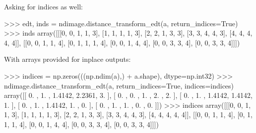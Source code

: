 \begin{DoxyVerb}
Asking for indices as well:

>>> edt, inds = ndimage.distance_transform_edt(a, return_indices=True)
>>> inds
array([[[0, 0, 1, 1, 3],
        [1, 1, 1, 1, 3],
        [2, 2, 1, 3, 3],
        [3, 3, 4, 4, 3],
        [4, 4, 4, 4, 4]],
       [[0, 0, 1, 1, 4],
        [0, 1, 1, 1, 4],
        [0, 0, 1, 4, 4],
        [0, 0, 3, 3, 4],
        [0, 0, 3, 3, 4]]])

With arrays provided for inplace outputs:

>>> indices = np.zeros(((np.ndim(a),) + a.shape), dtype=np.int32)
>>> ndimage.distance_transform_edt(a, return_indices=True, indices=indices)
array([[ 0.    ,  1.    ,  1.4142,  2.2361,  3.    ],
       [ 0.    ,  0.    ,  1.    ,  2.    ,  2.    ],
       [ 0.    ,  1.    ,  1.4142,  1.4142,  1.    ],
       [ 0.    ,  1.    ,  1.4142,  1.    ,  0.    ],
       [ 0.    ,  1.    ,  1.    ,  0.    ,  0.    ]])
>>> indices
array([[[0, 0, 1, 1, 3],
        [1, 1, 1, 1, 3],
        [2, 2, 1, 3, 3],
        [3, 3, 4, 4, 3],
        [4, 4, 4, 4, 4]],
       [[0, 0, 1, 1, 4],
        [0, 1, 1, 1, 4],
        [0, 0, 1, 4, 4],
        [0, 0, 3, 3, 4],
        [0, 0, 3, 3, 4]]])\end{DoxyVerb}
 \hypertarget{namespacescipy_1_1ndimage_1_1morphology_a922ee701102af4c8ec474616de017af3}{}
